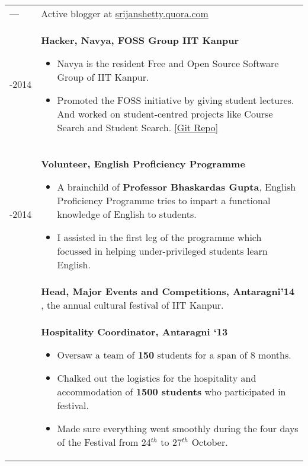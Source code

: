 \documentclass[a4paper,10pt]{article} %
\begin{document}
\begin{tabular}{>{\raggedleft}p{2.2cm}p{15cm}}

    ---   & Active blogger at \href{srijanshetty.quora.com} {srijanshetty.quora.com} \\

    2013-2014    & \textbf{Hacker, Navya, FOSS Group IIT Kanpur}
                   \footnotesize{
                       \begin{itemize}[leftmargin=*]
                           \item Navya is the resident Free and Open Source Software Group of IIT Kanpur.
                           \item Promoted the FOSS initiative by giving student lectures.
                               And worked on student-centred projects like Course Search and Student Search.
                               \href{https://github.com/navya} {[Git Repo]}
                       \end{itemize}
                   }\\

    2013-2014    & \textbf{Volunteer, English Proficiency Programme}
                   \footnotesize{
                       \begin{itemize}[leftmargin=*]
                           \item A brainchild of \textbf{Professor Bhaskardas Gupta}, English Proficiency
                               Programme tries to impart a functional knowledge of English to students.
                           \item I assisted in the first leg of the programme which focussed in helping
                               under-privileged students learn English.
                       \end{itemize}
                   }\\

    2014 & \textbf{Head, Major Events and Competitions, Antaragni'14} , the annual cultural festival of
    IIT Kanpur. \\

    2013 & \textbf{Hospitality Coordinator, Antaragni ‘13}
           \footnotesize{
               \begin{itemize}[leftmargin=*]
                   \item Oversaw a team of \textbf{150} students for a span of 8 months.
                   \item Chalked out the logistics for the hospitality and accommodation of \textbf{1500 students} who
                       participated in festival.
                   \item Made sure everything went smoothly during the four days of the Festival from 24$^{th}$
                       to 27$^{th}$ October.
               \end{itemize}
           }\\


\end{tabular}
\end{document}
